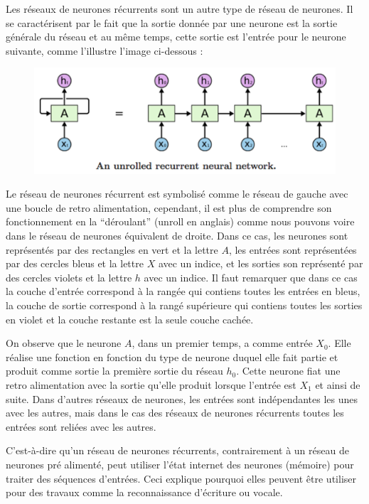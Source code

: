 \documentclass[conference,onecolumn]{IEEEtran}
\begin{document}
Les réseaux de neurones récurrents sont un autre type de réseau de neurones. Il se caractérisent par le fait que la sortie donnée par une neurone est la sortie générale du réseau et au même temps, cette sortie est l’entrée pour le neurone suivante, comme l'illustre l'image ci-dessous : 

 \begin{figure}[H]
 \centering
    \includegraphics[scale=0.5]{img14.png}
\end{figure}


Le réseau de neurones récurrent est symbolisé comme le réseau de gauche avec une boucle de retro alimentation, cependant, il est plus de comprendre son fonctionnement en la “déroulant” (unroll en anglais) comme nous pouvons voire dans le réseau de neurones équivalent de droite. Dans ce cas, les neurones sont représentés par des rectangles en vert et la lettre $A$, les entrées sont représentées par des cercles bleus et la lettre $X$ avec un indice, et les sorties son représenté par des cercles violets et la lettre $h$ avec un indice. Il faut remarquer que dans ce cas la couche d’entrée correspond à la rangée qui contiens toutes les entrées en bleus, la couche de sortie correspond à la rangé supérieure qui contiens toutes les sorties en violet et la couche restante est la seule couche cachée. 

On observe que le neurone $A$, dans un premier temps, a comme entrée $X_0$. Elle réalise une fonction en fonction du type de neurone duquel elle fait partie et produit comme sortie la première sortie du réseau $h_0$.  Cette neurone fiat une retro alimentation avec la sortie qu’elle produit lorsque l’entrée est $X_1$ et ainsi de suite. Dans d’autres réseaux de neurones, les entrées sont indépendantes les unes avec les autres, mais dans le cas des réseaux de neurones récurrents toutes les entrées sont reliées avec les autres. 

C’est-à-dire qu'un réseau de neurones récurrents, contrairement à un réseau de neurones pré alimenté, peut utiliser l’état internet des neurones (mémoire) pour traiter des séquences d’entrées. Ceci explique pourquoi elles peuvent être utiliser pour des travaux comme la reconnaissance d’écriture ou vocale. 
\end{document}
